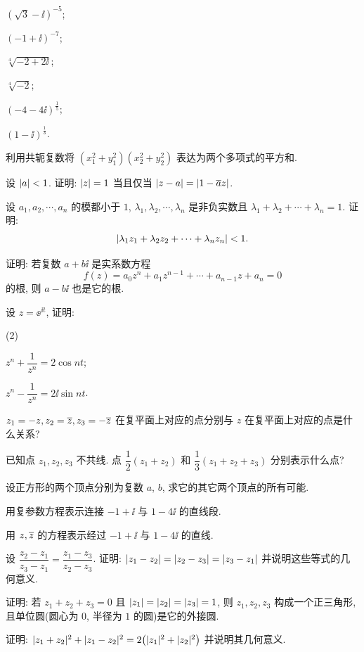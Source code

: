 \begin{homework}
\begin{homework}
\begin{subhomework}
      \item $(\sqrt3-\ii)^{-5}$;
      \item $(-1+\ii)^{-7}$;
      \item $\sqrt[4]{-2+2\ii}$;
      \item $\sqrt[4]{-2}$;
      \item $(-4-4\ii)^{\frac15}$;
      \item $(1-\ii)^{\frac13}$.
    \end{subhomework}
    \item 利用共轭复数将 $(x_1^2+y_1^2)(x_2^2+y_2^2)$ 表达为两个多项式的平方和.
    \item 设 $\lvert a\rvert<1$. 证明: $\lvert z\rvert=1$ 当且仅当 $\lvert z-a\rvert=\lvert1-\overline az\rvert$.
    \item 设 $a_1,a_2,\cdots,a_n$ 的模都小于 $1$, $\lambda_1,\lambda_2,\cdots,\lambda_n$ 是非负实数且 $\lambda_1+\lambda_2+\cdots+\lambda_n=1$. 证明:
    \[
      \lvert\lambda_1z_1+\lambda_2z_2+\cdots+\lambda_nz_n\rvert<1.
    \]
    \item 证明: 若复数 $a+b\ii$ 是实系数方程
      \[
        f(z)=a_0z^n+a_1z^{n-1}+\cdots+a_{n-1}z+a_n=0
      \]
      的根, 则 $a-b\ii$ 也是它的根.
    \item 设 $z=\ee^{\ii t}$, 证明:
    \begin{subhomework}(2)
      \item $z^n+\dfrac1{z^n}=2\cos{nt}$;
      \item $z^n-\dfrac1{z^n}=2\ii\sin{nt}$.
    \end{subhomework}
    \item $z_1=-z,z_2=\overline z,z_3=-\overline{z}$ 在复平面上对应的点分别与 $z$ 在复平面上对应的点是什么关系?
    \item 已知点 $z_1,z_2,z_3$ 不共线. 点 $\dfrac12(z_1+z_2)$ 和 $\dfrac13(z_1+z_2+z_3)$ 分别表示什么点?
    \item 设正方形的两个顶点分别为复数 $a$, $b$, 求它的其它两个顶点的所有可能.
    \item 用复参数方程表示连接 $-1+\ii$ 与 $1-4\ii$ 的直线段.
    \item 用 $z,\overline z$ 的方程表示经过 $-1+\ii$ 与 $1-4\ii$ 的直线.
    \item 设 $\dfrac{z_2-z_1}{z_3-z_1}=\dfrac{z_1-z_3}{z_2-z_3}$. 证明: $\lvert z_1-z_2\rvert=\lvert z_2-z_3\rvert=\lvert z_3-z_1\rvert$ 并说明这些等式的几何意义.
    \item 证明: 若 $z_1+z_2+z_3=0$ 且 $\lvert z_1\rvert=\lvert z_2\rvert=\lvert z_3\rvert=1$, 则 $z_1,z_2,z_3$ 构成一个正三角形, 且单位圆(圆心为 $0$, 半径为 $1$ 的圆)是它的外接圆.
    \item 证明: $\lvert z_1+z_2\rvert^2+\lvert z_1-z_2\rvert^2=2\bigl(\lvert z_1\rvert^2+\lvert z_2\rvert^2\bigr)$ 并说明其几何意义.

\end{homework}
\end{homework}
